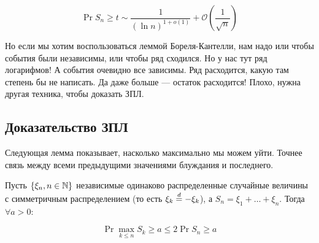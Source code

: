 \[
  \Pr{S_n \geq t} \sim \frac{1}{(\ln n)^{1 + o(1)}} + \mathcal{O}\left(\frac{1}{\sqrt{n}}\right)
\]

Но если мы хотим воспользоваться леммой Бореля-Кантелли, нам надо или чтобы
события были независимы, или чтобы ряд сходился. Но у нас тут ряд логарифмов! А события
очевидно все зависимы.
Ряд расходится, какую там степень бы не написать. Да даже больше --- остаток расходится!
Плохо, нужна другая техника, чтобы доказать ЗПЛ.

\subsection{Доказательство ЗПЛ}

Следующая лемма показывает, насколько максимально мы можем уйти. Точнее связь
между всеми предыдущими значениями блуждания и последнего.

\begin{theorem}
  Пусть $\{\xi_n, n \in \mathbb{N}\}$ независимые одинаково распределенные случайные
  величины с симметричным распределением (то есть $\xi_k \overset{d}{=} -\xi_k$), а
  $S_n = \xi_1 + \ldots + \xi_n$. Тогда $\forall a > 0$:

  \[
    \Pr{\max\limits_{k \leq n} S_k \geq a} \leq 2\Pr{S_n \geq a}
  \]
\end{theorem}

